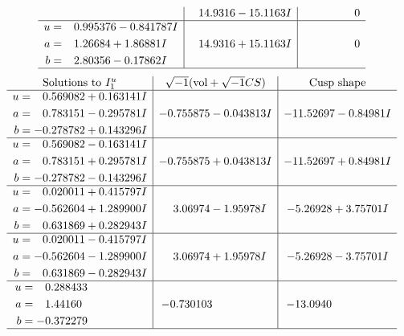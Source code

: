\documentclass[1p]{elsarticle_modified}
\theoremstyle{definition}
\newcommand{\I}{\sqrt{-1}}
\begin{document}
$$\begin{array}{c|c|c}
 & \phantom{-}14.9316 - 15.1163 I & \phantom{-0.000000 } 0 \\ \hline\begin{aligned}
u &= \phantom{-}0.995376 - 0.841787 I \\
a &= \phantom{-}1.26684 + 1.86881 I \\
b &= \phantom{-}2.80356 - 0.17862 I\end{aligned}
 & \phantom{-}14.9316 + 15.1163 I & \phantom{-0.000000 } 0\\
 \hline 
 \end{array}$$\newpage$$\begin{array}{c|c|c}  
\text{Solutions to }I^u_{1}& \I (\text{vol} + \sqrt{-1}CS) & \text{Cusp shape}\\
 \hline 
\begin{aligned}
u &= \phantom{-}0.569082 + 0.163141 I \\
a &= \phantom{-}0.783151 - 0.295781 I \\
b &= -0.278782 + 0.143296 I\end{aligned}
 & -0.755875 - 0.043813 I & -11.52697 - 0.84981 I \\ \hline\begin{aligned}
u &= \phantom{-}0.569082 - 0.163141 I \\
a &= \phantom{-}0.783151 + 0.295781 I \\
b &= -0.278782 - 0.143296 I\end{aligned}
 & -0.755875 + 0.043813 I & -11.52697 + 0.84981 I \\ \hline\begin{aligned}
u &= \phantom{-}0.020011 + 0.415797 I \\
a &= -0.562604 + 1.289900 I \\
b &= \phantom{-}0.631869 + 0.282943 I\end{aligned}
 & \phantom{-}3.06974 - 1.95978 I & -5.26928 + 3.75701 I \\ \hline\begin{aligned}
u &= \phantom{-}0.020011 - 0.415797 I \\
a &= -0.562604 - 1.289900 I \\
b &= \phantom{-}0.631869 - 0.282943 I\end{aligned}
 & \phantom{-}3.06974 + 1.95978 I & -5.26928 - 3.75701 I \\ \hline\begin{aligned}
u &= \phantom{-}0.288433\phantom{ +0.000000I} \\
a &= \phantom{-}1.44160\phantom{ +0.000000I} \\
b &= -0.372279\phantom{ +0.000000I}\end{aligned}
 & -0.730103\phantom{ +0.000000I} & -13.0940\phantom{ +0.000000I}\\
 \hline 
 \end{array}$$\newpage\newpage\renewcommand{\arraystretch}{1}
\end{document}
